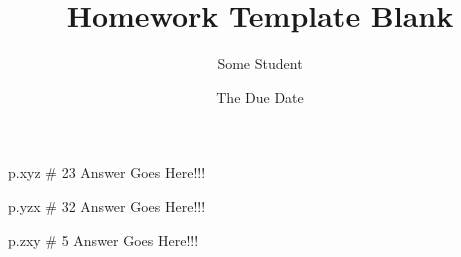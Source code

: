 \documentclass[12pt]{article}
\title{Homework Template Blank}
\author{Some Student}
\date{The Due Date}
\begin{document}
\markboth{\theauthor}{\thetitle}

\maketitle


    \begin{problem}{p.xyz \# 23}
        Answer Goes Here!!!
    \end{problem}

    \begin{problem}{p.yzx \# 32}
        Answer Goes Here!!!
    \end{problem}

    \begin{problem}{p.zxy \# 5}
        Answer Goes Here!!!
    \end{problem}
\end{document}

